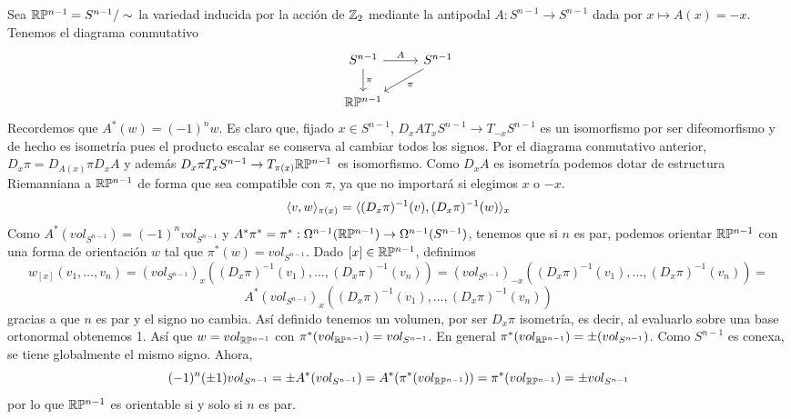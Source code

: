 \documentclass[CV.tex]{subfiles}
\begin{document}
\begin{ej}
Sea $\mathbb{R} \mathbb{P}^{n-1}=S^{n-1}/\sim$ la variedad inducida por la acción de $\mathbb{Z}_2$ mediante la antipodal $A:S^{n-1}\to S^{n-1}$ dada por $x\mapsto A(x)=-x$. Tenemos el diagrama conmutativo
\[
\begin{tikzcd}
S^{n-1}\arrow[r,"A"]\arrow[d, "\pi"] & S^{n-1}\arrow[dl, "\pi"]\\
\R\PP^{n-1} & 
\end{tikzcd}
\]
Recordemos que $A^*(w)=(-1)^nw$. Es claro que, fijado $x\in S^{n-1}$, $D_xA T_xS^{n-1}\to T_{-x}S^{n-1}$ es un isomorfismo por ser difeomorfismo y de hecho es isometría pues el producto escalar se conserva al cambiar todos los signos. Por el diagrama conmutativo anterior, $D_x\pi=D_{A(x)}\pi D_xA$ y además $D_x\pi T_xS^{n-1}\to T_{\pi(x)}\mathbb{R}\mathbb{P}^{n-1}$ es isomorfismo. Como $D_xA$ es isometría podemos dotar de estructura Riemanniana a $\mathbb{R}\mathbb{P}^{n-1}$ de forma que sea compatible con $\pi$, ya que no importará si elegimos $x$ o $-x$.
\[
\langle{v,w}\rangle_{\pi(x)}=\langle{(D_x\pi)^{-1}(v),(D_x\pi)^{-1}(w)}\rangle_x
\]
Como $A^*(vol_{S^{n-1}})=(-1)^nvol_{S^{n-1}}$ y $A^*\pi^*=\pi^*:\Omega^{n-1}(\mathbb{R}\mathbb{P}^{n-1})\to\Omega^{n-1}(S^{n-1})$, tenemos que si $n$ es par, podemos orientar $\mathbb{R}\mathbb{P}^{n-1}$ con una forma de orientación $w$ tal que $\pi^*(w)=vol_{S^{n-1}}$. Dado $[x]\in\mathbb{R}\mathbb{P}^{n-1}$, definimos
\[
w_{[x]}(v_1,\dots, v_n)=(vol_{S^{n-1}})_x((D_x\pi)^{-1}(v_1),\dots, (D_x\pi)^{-1}(v_n))=(vol_{S^{n-1}})_{-x}((D_x\pi)^{-1}(v_1),\dots, (D_x\pi)^{-1}(v_n))=
\] 
\[
A^*(vol_{S^{n-1}})_x((D_x\pi)^{-1}(v_1),\dots, (D_x\pi)^{-1}(v_n))
\]
gracias a que $n$ es par y el signo no cambia. Así definido tenemos un volumen, por ser $D_x\pi$ isometría, es decir, al evaluarlo sobre una base ortonormal obtenemos 1. Así que $w=vol_{\mathbb{R}\mathbb{P}^{n-1}}$ con $\pi^*(vol_{\mathbb{R}\mathbb{P}^{n-1}})=vol_{S^{n-1}}$. En general $\pi^*(vol_{\mathbb{R}\mathbb{P}^{n-1}})=\pm (vol_{S^{n-1}})$. Como $S^{n-1}$ es conexa, se tiene globalmente el mismo signo. Ahora,
\[
(-1)^n(\pm 1)vol_{S^{n-1}}=\pm A^*(vol_{S^{n-1}})=A^*(\pi^*(vol_{\mathbb{R}\mathbb{P}^{n-1}}))=\pi^*(vol_{\mathbb{R}\mathbb{P}^{n-1}})=\pm vol_{S^{n-1}}
\]
por lo que $\mathbb{R}\mathbb{P}^{n-1}$ es orientable si y solo si $n$ es par.
\end{ej}
\end{document}

